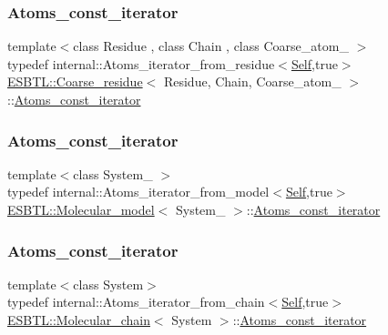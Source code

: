 \subsubsection{\texorpdfstring{Atoms\+\_\+const\+\_\+iterator}{Atoms\_const\_iterator}\hspace{0.1cm}{\footnotesize\ttfamily [1/4]}}
{\footnotesize\ttfamily template$<$class Residue , class Chain , class Coarse\+\_\+atom\+\_\+ $>$ \\
typedef internal\+::\+Atoms\+\_\+iterator\+\_\+from\+\_\+residue$<$\hyperlink{classESBTL_1_1Coarse__residue}{Self},true$>$ \hyperlink{classESBTL_1_1Coarse__residue}{E\+S\+B\+T\+L\+::\+Coarse\+\_\+residue}$<$ Residue, Chain, Coarse\+\_\+atom\+\_\+ $>$\+::\hyperlink{group__grp__iters_gabb95e73700fd84dbde6e089927e03a6d}{Atoms\+\_\+const\+\_\+iterator}}

\mbox{\label{group__grp__iters_ga41096063f109fca33976a17af4b3a1e4}} 
\subsubsection{\texorpdfstring{Atoms\+\_\+const\+\_\+iterator}{Atoms\_const\_iterator}\hspace{0.1cm}{\footnotesize\ttfamily [2/4]}}
{\footnotesize\ttfamily template$<$class System\+\_\+ $>$ \\
typedef internal\+::\+Atoms\+\_\+iterator\+\_\+from\+\_\+model$<$\hyperlink{classESBTL_1_1Molecular__model}{Self},true$>$ \hyperlink{classESBTL_1_1Molecular__model}{E\+S\+B\+T\+L\+::\+Molecular\+\_\+model}$<$ System\+\_\+ $>$\+::\hyperlink{group__grp__iters_ga41096063f109fca33976a17af4b3a1e4}{Atoms\+\_\+const\+\_\+iterator}}

\mbox{\label{group__grp__iters_gad872d386b268126c9bb2a2127a6a7254}} 
\subsubsection{\texorpdfstring{Atoms\+\_\+const\+\_\+iterator}{Atoms\_const\_iterator}\hspace{0.1cm}{\footnotesize\ttfamily [3/4]}}
{\footnotesize\ttfamily template$<$class System$>$ \\
typedef internal\+::\+Atoms\+\_\+iterator\+\_\+from\+\_\+chain$<$\hyperlink{classESBTL_1_1Molecular__chain}{Self},true$>$ \hyperlink{classESBTL_1_1Molecular__chain}{E\+S\+B\+T\+L\+::\+Molecular\+\_\+chain}$<$ System $>$\+::\hyperlink{group__grp__iters_gad872d386b268126c9bb2a2127a6a7254}{Atoms\+\_\+const\+\_\+iterator}}


